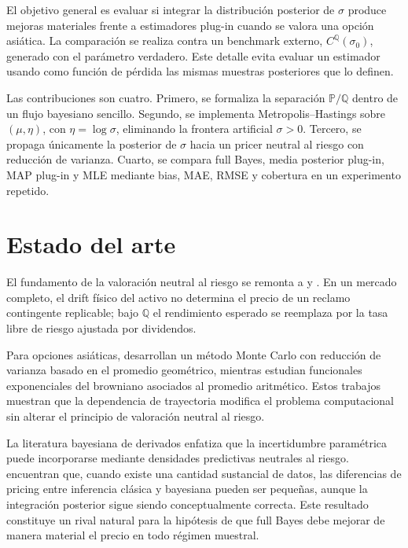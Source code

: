 \documentclass[12pt,letterpaper]{article}
\newcommand{\Pmeasure}{\mathbb{P}}
\newcommand{\Qmeasure}{\mathbb{Q}}
\begin{document}
El objetivo general es evaluar si integrar la distribución posterior de $\sigma$ produce mejoras materiales frente a estimadores plug-in cuando se valora una opción asiática. La comparación se realiza contra un benchmark externo, $C^{\Qmeasure}(\sigma_0)$, generado con el parámetro verdadero. Este detalle evita evaluar un estimador usando como función de pérdida las mismas muestras posteriores que lo definen.

Las contribuciones son cuatro. Primero, se formaliza la separación $\Pmeasure/\Qmeasure$ dentro de un flujo bayesiano sencillo. Segundo, se implementa Metropolis--Hastings sobre $(\mu,\eta)$, con $\eta=\log\sigma$, eliminando la frontera artificial $\sigma>0$. Tercero, se propaga únicamente la posterior de $\sigma$ hacia un pricer neutral al riesgo con reducción de varianza. Cuarto, se compara full Bayes, media posterior plug-in, MAP plug-in y MLE mediante bias, MAE, RMSE y cobertura en un experimento repetido.

\section{Estado del arte}

El fundamento de la valoración neutral al riesgo se remonta a \citet{blackscholes1973} y \citet{merton1973}. En un mercado completo, el drift físico del activo no determina el precio de un reclamo contingente replicable; bajo $\Qmeasure$ el rendimiento esperado se reemplaza por la tasa libre de riesgo ajustada por dividendos.

Para opciones asiáticas, \citet{kemnavorst1990} desarrollan un método Monte Carlo con reducción de varianza basado en el promedio geométrico, mientras \citet{gemanyor1993} estudian funcionales exponenciales del browniano asociados al promedio aritmético. Estos trabajos muestran que la dependencia de trayectoria modifica el problema computacional sin alterar el principio de valoración neutral al riesgo.

La literatura bayesiana de derivados enfatiza que la incertidumbre paramétrica puede incorporarse mediante densidades predictivas neutrales al riesgo. \citet{romboutsstentoft2014} encuentran que, cuando existe una cantidad sustancial de datos, las diferencias de pricing entre inferencia clásica y bayesiana pueden ser pequeñas, aunque la integración posterior sigue siendo conceptualmente correcta. Este resultado constituye un rival natural para la hipótesis de que full Bayes debe mejorar de manera material el precio en todo régimen muestral.
\end{document}
